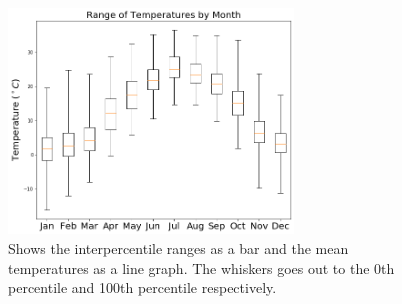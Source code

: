 \documentclass[11pt]{report}
\begin{document}
\begin{figure}[b]
	\centering
	\includegraphics[width=0.675\textwidth]{Figures/Temp_range.png}
	\caption[Temperature range for Princeton (2017- 2021)]{\label{Temp_range}
	Shows the interpercentile ranges as a bar and the mean temperatures as a line graph. The whiskers goes out to the 0th percentile and 100th percentile respectively. }
\end{figure}
\clearpage
\end{document}

